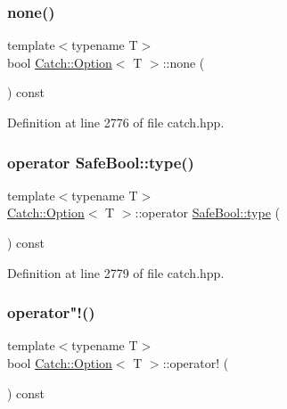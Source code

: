 \subsubsection{\texorpdfstring{none()}{none()}}
{\footnotesize\ttfamily template$<$typename T$>$ \\
bool \hyperlink{class_catch_1_1_option}{Catch\+::\+Option}$<$ T $>$\+::none (\begin{DoxyParamCaption}{ }\end{DoxyParamCaption}) const\hspace{0.3cm}{\ttfamily [inline]}}



Definition at line 2776 of file catch.\+hpp.

\hypertarget{class_catch_1_1_option_a8ed8de7b072f893c85df14913dbbe197}{}\label{class_catch_1_1_option_a8ed8de7b072f893c85df14913dbbe197} 
\subsubsection{\texorpdfstring{operator Safe\+Bool\+::type()}{operator SafeBool::type()}}
{\footnotesize\ttfamily template$<$typename T$>$ \\
\hyperlink{class_catch_1_1_option}{Catch\+::\+Option}$<$ T $>$\+::operator \hyperlink{class_catch_1_1_safe_bool_a39eef9baed296299d625a54d54a2a958}{Safe\+Bool\+::type} (\begin{DoxyParamCaption}{ }\end{DoxyParamCaption}) const\hspace{0.3cm}{\ttfamily [inline]}}



Definition at line 2779 of file catch.\+hpp.

\hypertarget{class_catch_1_1_option_a96dccb86bdf45ee0c08e122b6133bef3}{}\label{class_catch_1_1_option_a96dccb86bdf45ee0c08e122b6133bef3} 
\subsubsection{\texorpdfstring{operator"!()}{operator!()}}
{\footnotesize\ttfamily template$<$typename T$>$ \\
bool \hyperlink{class_catch_1_1_option}{Catch\+::\+Option}$<$ T $>$\+::operator! (\begin{DoxyParamCaption}{ }\end{DoxyParamCaption}) const\hspace{0.3cm}{\ttfamily [inline]}}



